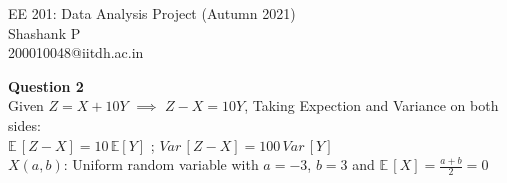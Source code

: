 \documentclass[30pt a4paper]{report}
\begin{document}
	\Large
	\begin{center}
		\Large EE 201: Data Analysis Project (Autumn 2021) \\
		\large
		\hspace{10pt}
		Shashank P \\
		200010048@iitdh.ac.in\\
	\end{center}
	\normalsize
\textbf{\Large Question 2 \\}
\normalsize
	Given $Z = X + 10Y$ $\implies$ $Z - X = 10Y$, 
	Taking Expection and Variance on both sides: \\
	$\mathbb{E}\,[Z-X] = 10\,\mathbb{E}[Y]$ ; $Var\,[Z-X] = 100\,Var\,[Y]$ \\
	$X(a, b)$: Uniform random variable with $a=-3$, $b=3$ and	$\mathbb{E}\,[X] = \frac{a+b}{2} = 0$ \\
\end{document}
